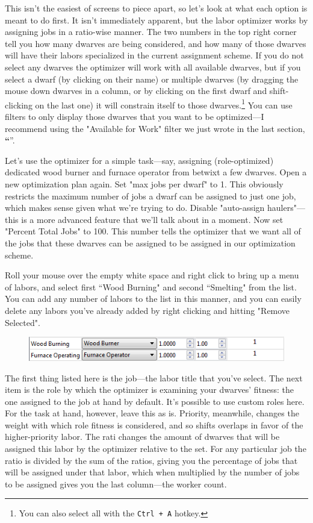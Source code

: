 \documentclass[]{article}
\newcommand{\jump}[1] {\textbf{``\nameref{sec:#1}}''}
\begin{document}
This isn't the easiest of screens to piece apart, so let's look at what each option is meant to do first.
It isn't immediately apparent, but the labor optimizer works by assigning jobs in a ratio-wise manner.
The two numbers in the top right corner tell you how many dwarves are being considered, and how many of
those dwarves will have their labors specialized in the current assignment scheme. If you do not select
any dwarves the optimizer will work with all available dwarves, but if you select a dwarf (by clicking on
their name) or multiple dwarves (by dragging the mouse down dwarves in a column, or by clicking on
the first dwarf and shift-clicking on the last one) it will constrain itself to those
dwarves.\footnote{You can also select all with the \texttt{Ctrl + A} hotkey.} You can use filters to
only display those dwarves that you want to be optimized---I recommend using the "Available for Work"
filter we just wrote in the last section, \jump{Writing Complex Scripts}.

Let's use the optimizer for a simple task---say, assigning  (role-optimized) dedicated wood burner and
furnace operator from betwixt a few dwarves. Open a new optimization plan again. Set "max jobs per dwarf"
to 1. This obviously restricts the maximum number of jobs a dwarf can be assigned to just one job, which
makes sense given what we're trying to do. Disable "auto-assign haulers"---this is a more advanced
feature that we'll talk about in a moment. Now set "Percent Total Jobs" to 100. This number tells the
optimizer that we want all of the jobs that these dwarves can be assigned to be assigned in our
optimization scheme.

Roll your mouse over the empty white space and right click to bring up a menu of labors, and select first
``Wood Burning" and second ``Smelting" from the list. You can add any number of labors to the list in
this manner, and you can easily delete any labors you've already added by right clicking and hitting
"Remove Selected".

\begin{figure}[h!]
\centering
\includegraphics[scale=1]{Sec4Fig7}
\end{figure}

The first thing listed here is the job---the labor title that you've select. The next item is the role by
which the optimizer is examining your dwarves' fitness: the one assigned to the job at hand by default.
It's possible to use custom roles here. For the task at hand, however, leave this as is. Priority,
meanwhile, changes the weight with which role fitness is considered, and so shifts overlaps in favor of
the higher-priority labor. The rati changes the amount of dwarves that will be
assigned this labor by the optimizer relative to the set. For any particular job the ratio is
divided by the sum of the ratios, giving you the percentage of jobs that will be assigned under that
labor, which when multiplied by the number of jobs to be assigned gives you the last column---the worker
count.
\end{document}
